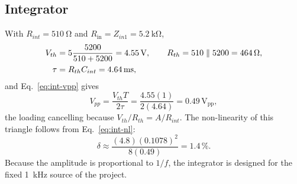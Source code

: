 \documentclass[12pt,a4paper]{article}
\begin{document}
	\subsection{Integrator}
	With $R_{int}=\SI{510}{\ohm}$ and $R_{\mathrm{in}}=Z_{in1}=\SI{5.2}{\kilo\ohm}$,
	\begin{align}
		V_{th}&=5\frac{5200}{510+5200}=4.55\,\mathrm{V},\qquad R_{th}=510\parallel5200=464\,\Omega,\notag\\
		\tau&=R_{th}C_{int}=4.64\,\mathrm{ms},
		\label{eq:calc-int}
	\end{align}
	and Eq.~\eqref{eq:int-vpp} gives
	\begin{equation}
		V_{pp}=\frac{V_{th}T}{2\tau}=\frac{4.55(1)}{2(4.64)}=0.49\,\mathrm{V_{pp}},
		\label{eq:calc-intvpp}
	\end{equation}
	the loading cancelling because $V_{th}/R_{th}=A/R_{int}$. The non-linearity of this triangle follows from Eq.~\eqref{eq:int-nl}:
	\begin{equation}
		\delta\approx\frac{(4.8)(0.1078)^2}{8(0.49)}=1.4\,\% .
		\label{eq:calc-intnl}
	\end{equation}
	Because the amplitude is proportional to $1/f$, the integrator is designed for the fixed \SI{1}{\kilo\hertz} source of the project.
\end{document}
